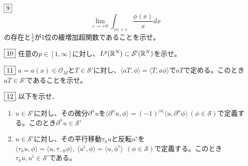 \documentclass[dvipdfmx, leqno]{jsreport}
\begin{document}
\begin{tcolorbox}$\fbox{9}$
\begin{equation}
    \lim_{\epsilon\to +0} \int_{|x|> \epsilon} \frac{\phi(x)}{x}dx
\end{equation}
    の存在と$\frac{1}{x}$が1位の緩増加超関数であることを示せ。
\end{tcolorbox}
\begin{tcolorbox}$\fbox{10}$
    任意の$p\in [1, \infty]$に対し、$L^p(\mathbb{R}^N)\subset \mathcal{S}'(\mathbb{R}^N)$を示せ。
\end{tcolorbox}
\begin{tcolorbox}$\fbox{11}$
    $a= a(x)\in \mathcal{O}_M$と$T\in \mathcal{S}'$に対し、$\langle{aT, \phi}\rangle= \langle{T, a\phi}\rangle$で$aT$で定める。このとき$aT\in \mathcal{S}'$であることを示せ。
\end{tcolorbox}
\begin{tcolorbox}$\fbox{12}$
    以下を示せ．
\begin{enumerate}
    \item $u\in \mathcal{S}'$に対し、その微分$\partial^\alpha u$を$\langle{\partial^\alpha u, \phi}\rangle= (-1)^{|\alpha|}\langle{u, \partial^\alpha \phi}\rangle\ (\phi\in \mathcal{S})$で定義する。このとき$\partial^\alpha u\in \mathcal{S}'$
    \item $u\in \mathcal{S}'$に対し、その平行移動$\tau_h u$と反転$u^\flat$を$\langle{\tau_h u, \phi}\rangle= \langle{u, \tau_{-h} \phi}\rangle,\ \langle{u^\flat, \phi}\rangle= \langle{u, \phi^\flat}\rangle\ \ (\phi\in \mathcal{S})$で定義する。このとき$\tau_h u, u^\flat\in \mathcal{S}'$である。
\end{enumerate}
\end{tcolorbox}
\end{document}
